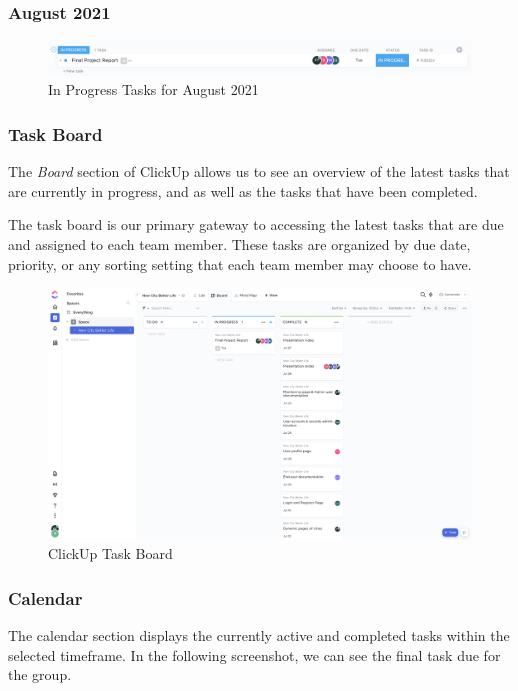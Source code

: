 \documentclass[12pt, letterpaper]{article}
\begin{document}
\subsubsection*{August 2021}
\begin{figure}[htbp]
	\centering
	\includegraphics[width=\textwidth]{images/29-clickup-month3.png}
	\caption{In Progress Tasks for August 2021}
\end{figure}


\newpage
\subsubsection*{Task Board}
The \textit{Board} section of ClickUp allows us to see an overview of the latest tasks that are currently in progress, and as well as the tasks that have been completed.

The task board is our primary gateway to accessing the latest tasks that are due and assigned to each team member. These tasks are organized by due date, priority, or any sorting setting that each team member may choose to have.

\begin{figure}[htbp]
	\centering
	\includegraphics[width=5.2in]{images/29-clickup-board.png}
	\caption{ClickUp Task Board}
\end{figure}

\subsubsection*{Calendar}
The calendar section displays the currently active and completed tasks within the selected timeframe. In the following screenshot, we can see the final task due for the group.
\end{document}
